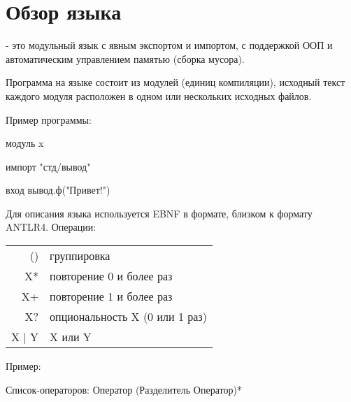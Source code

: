 \hypertarget{review}{%
\section{Обзор языка}\label{review:chapter}}

\thelang{} - это модульный язык с явным экспортом и импортом, с поддержкой ООП и автоматическим управлением памятью (сборка мусора).

Программа на языке \thelang{} состоит из модулей (единиц компиляции), исходный текст каждого модуля расположен в одном или нескольких исходных файлов.

Пример программы:
\begin{Trivil}
модуль x

импорт "стд/вывод"

вход { 
    вывод.ф("Привет!\n")
}
\end{Trivil}

Для описания языка используется EBNF в формате, близком к формату ANTLR4. Операции: 

\begin{tabular}[c]{r|l}
    () & группировка \\
    X* & повторение 0 и более раз \\
    X+ & повторение 1 и более раз \\
    X? & опциональность X (0 или 1 раз) \\
    X | Y & X или Y \\
\end{tabular}

\bigskip
Пример:
\begin{Grammar}[vspace=0pt]
Список-операторов: Оператор (Разделитель Оператор)* 
\end{Grammar}
